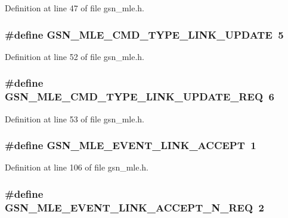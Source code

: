 Definition at line 47 of file gsn\_\-mle.h.

\hypertarget{a00527_a20f420343d8b5161b4fcc1450247b912}{
\subsubsection[{GSN\_\-MLE\_\-CMD\_\-TYPE\_\-LINK\_\-UPDATE}]{\setlength{\rightskip}{0pt plus 5cm}\#define GSN\_\-MLE\_\-CMD\_\-TYPE\_\-LINK\_\-UPDATE~5}}
\label{a00527_a20f420343d8b5161b4fcc1450247b912}


Definition at line 52 of file gsn\_\-mle.h.

\hypertarget{a00527_a756d9b90bdbd777f4ed78e783dc52514}{
\subsubsection[{GSN\_\-MLE\_\-CMD\_\-TYPE\_\-LINK\_\-UPDATE\_\-REQ}]{\setlength{\rightskip}{0pt plus 5cm}\#define GSN\_\-MLE\_\-CMD\_\-TYPE\_\-LINK\_\-UPDATE\_\-REQ~6}}
\label{a00527_a756d9b90bdbd777f4ed78e783dc52514}


Definition at line 53 of file gsn\_\-mle.h.

\hypertarget{a00527_a011ae7add0b9495af647fd4d8f2037c2}{
\subsubsection[{GSN\_\-MLE\_\-EVENT\_\-LINK\_\-ACCEPT}]{\setlength{\rightskip}{0pt plus 5cm}\#define GSN\_\-MLE\_\-EVENT\_\-LINK\_\-ACCEPT~1}}
\label{a00527_a011ae7add0b9495af647fd4d8f2037c2}


Definition at line 106 of file gsn\_\-mle.h.

\hypertarget{a00527_ad5e93bb6883ed682c1cc71c4153b308d}{
\subsubsection[{GSN\_\-MLE\_\-EVENT\_\-LINK\_\-ACCEPT\_\-N\_\-REQ}]{\setlength{\rightskip}{0pt plus 5cm}\#define GSN\_\-MLE\_\-EVENT\_\-LINK\_\-ACCEPT\_\-N\_\-REQ~2}}
\label{a00527_ad5e93bb6883ed682c1cc71c4153b308d}


